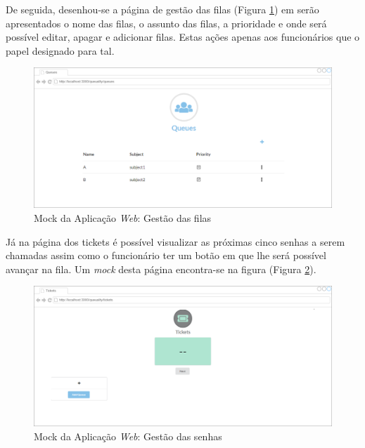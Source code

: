 \documentclass[12pt,a4paper]{article}
\begin{document}
De seguida, desenhou-se a página de gestão das filas (Figura \ref{fig:figure3}) em serão apresentados o nome das filas, o assunto das filas, a prioridade e onde
será possível editar, apagar e adicionar filas. Estas ações apenas aos funcionários que o papel designado para tal.\par
\begin{figure}[h]
    \centering
    \includegraphics[scale=0.25]{QueuesMock}
    \caption{Mock da Aplicação \textit{Web}: Gestão das filas}
    \label{fig:figure3}
\end{figure}
Já na página dos tickets é possível visualizar as próximas cinco senhas a serem chamadas assim como o funcionário ter um botão em que lhe será possível avançar na
fila. Um \textit{mock} desta página encontra-se na figura (Figura \ref{fig:figure4}).
\begin{figure}[h]
    \centering
    \includegraphics[scale=0.25]{TicketsMocks}
    \caption{Mock da Aplicação \textit{Web}: Gestão das senhas}
    \label{fig:figure4}
\end{figure}
\pagebreak
\end{document}
